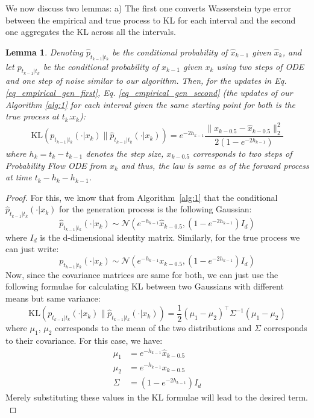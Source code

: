 \documentclass{article}
\newcommand{\KL}[2]{\mathrm{KL}\left(#1 \big\| #2\right)}
\newtheorem{lemma}{Lemma}[section]
\begin{document}
\noindent
We now discuss two lemmas: a) The first one converts Wasserstein type error between the empirical and true process to KL for each interval and the second one aggregates the KL across all the intervals. \\



\begin{lemma}
\label{lemma_first_kl_bw_conditionals}
 Denoting $\hat{p}_{t_{k-1}|t_k}$ be the conditional probability of
  $\hat{x}_{k-1}$  given $\hat{x}_k$, and let
  ${p}_{t_{k-1}|t_k}$ be the conditional probability of
  $x_{k-1}$ given $x_k$ using two steps of ODE and one step of noise similar to our algorithm. Then, for the updates in Eq. \ref{eq_empirical_gen_first}, Eq. \ref{eq_empirical_gen_second} (the updates of our Algorithm \ref{alg:1} for each interval given the same starting point for both is the true process at $t_k$:$x_{k}$):
  \[
    \KL{{p}_{t_{k-1}|t_k}(\cdot|{x}_{k})}{\hat{p}_{t_{k-1}|t_k}(\cdot|{x}_k)}
    =  e^{-2h_{k-1}}
    \frac{\|
      x_{k-0.5}-\hat{x}_{k-0.5}\|_2^2}
    {2 (1  -e^{-2h_{k-1}})} 
  \] 
where $h_{k}=t_{k}-t_{k-1}$ denotes the step size, $x_{k-0.5}$ corresponds to two steps of Probability Flow ODE from $x_k$ and thus, the law is same as of the forward process at time $t_k-h_{k}-h_{k-1}$.
\end{lemma}
\noindent
\begin{proof}
For this, we know that from Algorithm~\ref{alg:1} that the conditional $\hat{p}_{t_{k-1}|t_k}(\cdot|{x}_{k})$ for the generation process is the following Gaussian: 
\[
\hat{p}_{t_{k-1}|t_k}(\cdot|{x}_{k}) \sim \mathcal{N}\left(e^{-h_{k-1}} \hat{x}_{k-0.5}, \left(1 - e^{-2h_{k-1}}\right) I_d \right)
\]
where $I_d$ is the d-dimensional identity matrix. Similarly, for the true process we can just write:
\[
{p}_{t_{k-1}|t_k}(\cdot|{x}_{k}) \sim \mathcal{N}\left(e^{-h_{k-1}} {x}_{k-0.5}, \left(1 - e^{-2h_{k-1}}\right) I_d \right)
\]
Now, since the covariance matrices are same for both, we can just use the following formulae for calculating KL between two Gaussians with different means but same variance:
\[
\KL{{p}_{t_{k-1}|t_k}(\cdot|{x}_{k})}{\hat{p}_{t_{k-1}|t_k}(\cdot|{x}_k)} = \frac{1}{2}(\mu_1-\mu_2)^\top\Sigma^{-1}(\mu_1-\mu_2)  
\]
where $\mu_1$, $\mu_2$ corresponds to the mean of the two distributions and $\Sigma$ corresponds to their covariance. For this case, we have:
\begin{align*}
\mu_1 &= e^{-h_{k-1}} \hat{x}_{k-0.5} \\
\mu_2 &= e^{-h_{k-1}} {x}_{k-0.5} \\
\Sigma &= \left(1 - e^{-2h_{k-1}} \right) I_d
\end{align*}
Merely substituting these values in the KL formulae will lead to the desired term. \\
\end{proof}
\end{document}
